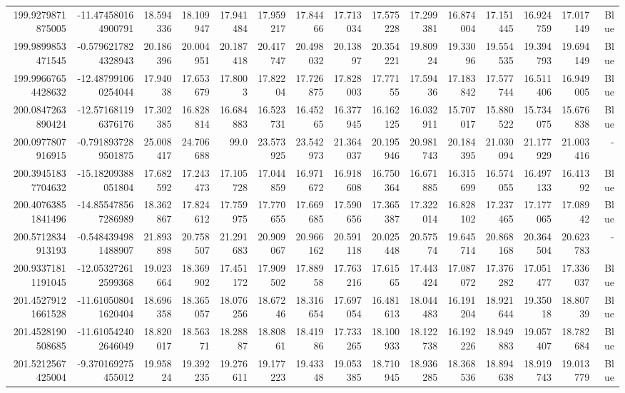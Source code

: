 \begin{center}
\begin{longtable}{rrrrrrrrrrrrrrr}
199.9279871875005 & -11.474580164900791 & 18.594336 & 18.109947 & 17.941484 & 17.959217 & 17.84466 & 17.713034 & 17.575228 & 17.299381 & 16.874004 & 17.151445 & 16.924759 & 17.017149 & Blue \\
199.9899853471545 & -0.5796217824328943 & 20.186396 & 20.004951 & 20.187418 & 20.417747 & 20.498032 & 20.13897 & 20.354221 & 19.80924 & 19.33096 & 19.554535 & 19.394793 & 19.694149 & Blue \\
199.99667654428632 & -12.487991060254044 & 17.94038 & 17.653679 & 17.8003 & 17.82204 & 17.726875 & 17.828003 & 17.77155 & 17.59436 & 17.183842 & 17.577744 & 16.511406 & 16.949005 & Blue \\
200.0847263890424 & -12.571681196376176 & 17.302385 & 16.828814 & 16.684883 & 16.523731 & 16.45265 & 16.377945 & 16.162125 & 16.032911 & 15.707017 & 15.880522 & 15.734075 & 15.676838 & Blue \\
200.0977807916915 & -0.7918937289501875 & 25.008417 & 24.706688 & 99.0 & 23.573925 & 23.542973 & 21.364037 & 20.195946 & 20.981743 & 20.184395 & 21.030094 & 21.177929 & 21.003416 & - \\
200.39451837704632 & -15.18209388051804 & 17.682592 & 17.243473 & 17.105728 & 17.044859 & 16.971672 & 16.918608 & 16.750364 & 16.671885 & 16.315699 & 16.574055 & 16.497133 & 16.41392 & Blue \\
200.40763851841496 & -14.855478567286989 & 18.362867 & 17.824612 & 17.759975 & 17.770655 & 17.669685 & 17.590656 & 17.365387 & 17.322014 & 16.828102 & 17.237465 & 17.177065 & 17.08942 & Blue \\
200.5712834913193 & -0.5484394981488907 & 21.893898 & 20.758507 & 21.291683 & 20.909067 & 20.966162 & 20.591118 & 20.025448 & 20.57574 & 19.645714 & 20.868168 & 20.364504 & 20.623783 & - \\
200.93371811191045 & -12.053272612599368 & 19.023664 & 18.369902 & 17.451172 & 17.909502 & 17.88958 & 17.763216 & 17.61565 & 17.443424 & 17.087072 & 17.376282 & 17.051477 & 17.336037 & Blue \\
201.45279121661528 & -11.610508041620404 & 18.696358 & 18.365057 & 18.076256 & 18.67246 & 18.316654 & 17.697054 & 16.481613 & 18.044483 & 16.191204 & 18.921644 & 19.35018 & 18.80739 & Blue \\
201.4528190508685 & -11.610542402646049 & 18.820017 & 18.56371 & 18.28887 & 18.80861 & 18.41986 & 17.733265 & 18.100933 & 18.122738 & 16.192226 & 18.949883 & 19.057407 & 18.782684 & Blue \\
201.5212567425004 & -9.370169275455012 & 19.95824 & 19.392235 & 19.276611 & 19.177223 & 19.43348 & 19.053385 & 18.710945 & 18.936285 & 18.368536 & 18.894638 & 18.919743 & 19.013779 & Blue \\

\end{longtable}
\end{center}
